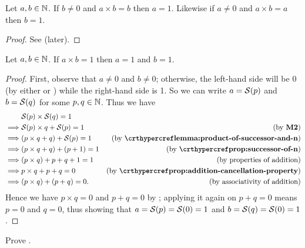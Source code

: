 \begin{proposition}\label{prop:product-that-equals-self}
    Let $a, b \in \mathbb{N}$. If $b \neq 0$ and $a \times b = b$ then $a = 1$. Likewise if $a \neq 0$ and $a \times b = a$ then $b = 1$.
\end{proposition}
\begin{proof}
    See  (later).
\end{proof}

\begin{proposition}\label{prop:product-that-equals-1}
    Let $a, b \in \mathbb{N}$. If $a \times b = 1$ then $a = 1$ and $b = 1$.
\end{proposition}
\begin{proof}
    First, observe that $a \neq 0$ and $b \neq 0$; otherwise, the left-hand side will be 0 (by either  or ) while the right-hand side is 1. So we can write $a = {\mathcal{S}(p)}$ and $b = {\mathcal{S}(q)}$ for some $p, q \in \mathbb{N}$. Thus we have
    \begin{align*}
        &\Successor{p} \times \Successor{q} = 1\\
        \implies& \Successor{p} \times q + \Successor{p} = 1 & (\text{by \textbf{M2}})\\
        \implies& (p\times q + q) + \Successor{p} = 1 & (\text{by \myref{lemma:product-of-successor-and-n}})\\
        \implies& (p \times q + q) + (p + 1) = 1 & (\text{by \myref{prop:successor-of-n}})\\
        \implies& (p \times q) + p + q + 1 = 1 & (\text{by properties of addition})\\
        \implies& p \times q + p + q = 0 & (\text{by \myref{prop:addition-cancellation-property}})\\
        \implies& (p \times q) + (p + q) = 0. & (\text{by associativity of addition})
    \end{align*}
    Hence we have $p \times q = 0$ and $p + q = 0$ by ; applying it again on $p + q = 0$ means $p = 0$ and $q = 0$, thus showing that $a = {\mathcal{S}(p)} = {\mathcal{S}(0)} = 1$ and $b = {\mathcal{S}(q)} = {\mathcal{S}(0)} = 1$.
\end{proof}

\begin{exercise}\label{exercise:product-that-equals-self}
    Prove .
\end{exercise}


